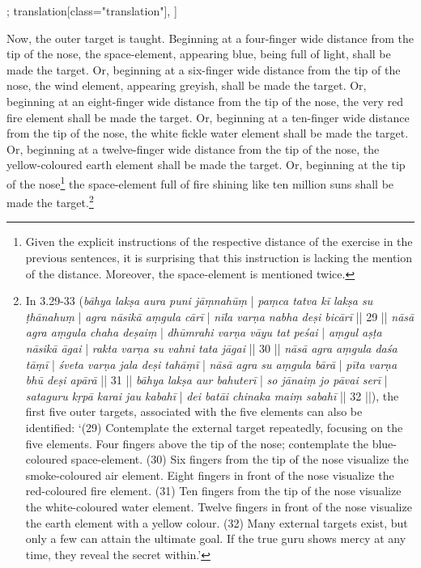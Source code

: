 \begin{alignment}[
  texts=edition[class="edition"];
  translation[class="translation"],
  ]
\begin{translation}
\begin{tlate}[p23_01]
  Now, the outer target is taught. Beginning at a four-finger wide distance from the tip of the nose, the space-element, appearing blue, being full of light, shall be made the target. Or, beginning at a six-finger wide distance from the tip of the nose, the wind element, appearing greyish, shall be made the target. Or, beginning at an eight-finger wide distance from the tip of the nose, the very red fire element shall be made the target. Or, beginning at a ten-finger wide distance from the tip of the nose, the white fickle water element shall be made the target. Or, beginning at a twelve-finger wide distance from the tip of the nose, the yellow-coloured earth element shall be made the target. Or, beginning at the tip of the nose\footnote{Given the explicit instructions of the respective distance of the exercise in the previous sentences, it is surprising that this instruction is lacking the mention of the distance. Moreover, the space-element is mentioned twice.} the space-element full of fire shining like ten million suns shall be made the target.\footnote{In  3.29-33 (\textit{bāhya lakṣa aura puni jāṃnahūṃ} | \textit{paṃca tatva kī lakṣa su ṭhānahuṃ} | \textit{agra nāsikā aṃgula cārī} | \textit{nīla varṇa nabha deṣi bicārī} || 29 || \textit{nāsā agra aṃgula chaha deṣaiṃ} | \textit{dhūmrahi varṇa vāyu tat peśai} | \textit{aṃgul aṣṭa nāsikā āgai} | \textit{rakta varṇa su vahni tata jāgai} || 30 || \textit{nāsā agra aṃgula daśa tāṃī} | \textit{śveta varṇa jala deṣi tahāṃī} | \textit{nāsā agra su aṃgula bārā} | \textit{pīta varṇa bhū deṣi apārā} || 31 || \textit{bāhya lakṣa aur bahuterī} | \textit{so jānaiṃ jo pāvai serī} | \textit{sataguru kṛpā karai jau kabahī} | \textit{dei batāi chinaka maiṃ sabahī} || 32 ||), the first five outer targets, associated with the five elements can also be identified: `(29) Contemplate the external target repeatedly, focusing on the five elements. Four fingers above the tip of the nose; contemplate the blue-coloured space-element. (30) Six fingers from the tip of the nose visualize the smoke-coloured air element. Eight fingers in front of the nose visualize the red-coloured fire element. (31) Ten fingers from the tip of the nose visualize the white-coloured water element. Twelve fingers in front of the nose visualize the earth element with a yellow colour. (32) Many external targets exist, but only a few can attain the ultimate goal. If the true guru shows mercy at any time, they reveal the secret within.'}
  \flushpage 
    \end{tlate}
  \end{translation}
\end{alignment}
